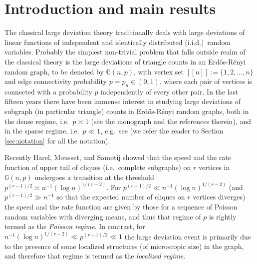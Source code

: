 \documentclass[a4paper,11pt,english,reqno]{amsart}
\numberwithin{equation}{section}
\newcommand{\G}{\mathbb{G}}
\newcommand{\set}[1]{[\![#1]\!]}
\begin{document}
	\section{Introduction and main results}
	The classical large deviation theory traditionally deals with large deviations of linear functions of independent and identically distributed (i.i.d.)~random variables. Probably the simplest non-trivial problem that falls outside realm of the classical theory is the large deviations of triangle counts in an Erd\H{o}s-R\'enyi random graph, to be denoted by $\G(n,p)$, with vertex set $\set{n}:=\{1,2,\ldots, n\}$ and edge connectivity probability $p=p_n \in (0,1)$, where each pair of vertices is connected with a probability $p$ independently of every other pair.  In the last fifteen years there have been immense interest in studying large deviations of subgraph (in particular triangle) counts in Erd\H{o}s-R\'enyi random graphs, both in the dense regime, i.e.~$p \asymp 1$ (see the monograph \cite{chatterjeemono} and the references therein), and in the sparse regime, i.e.~$p \ll 1$, e.g.~see \cite{augeri, BGLZ, chatterjeedembo, cookdembo, CDP, eldan} (we refer the reader to Section \ref{sec:notation} for all the notation). 
	
	
	Recently Harel, Mousset, and Samotij \cite{HMS} showed that the speed and the rate function of upper tail of cliques (i.e.~complete subgraphs) on $r$ vertices in $\G(n,p)$ undergoes a transition at the threshold $p^{({r-1})/{2}} \asymp n^{-1} (\log n)^{{1}/({r-2})}$. For $p^{({r-1})/{2}} \ll n^{-1} (\log n)^{{1}/({r-2})}$ (and $p^{(r-1)/2} \gg n^{-1}$ so that the expected number of cliques on $r$ vertices diverges) the speed and the rate function are given by those for a sequence of Poisson random variables with diverging means, and thus that regime of $p$ is rightly termed as the {\em Poisson regime}. In contrast, for $  n^{-1} (\log n)^{{1}/({r-2})} \ll p^{({r-1})/{2}}  \ll 1$ the large deviation event is primarily due to the presence of some localized structures (of microscopic size) in the graph, and therefore that regime is termed as the {\em localized regime}. 
	
\end{document}
